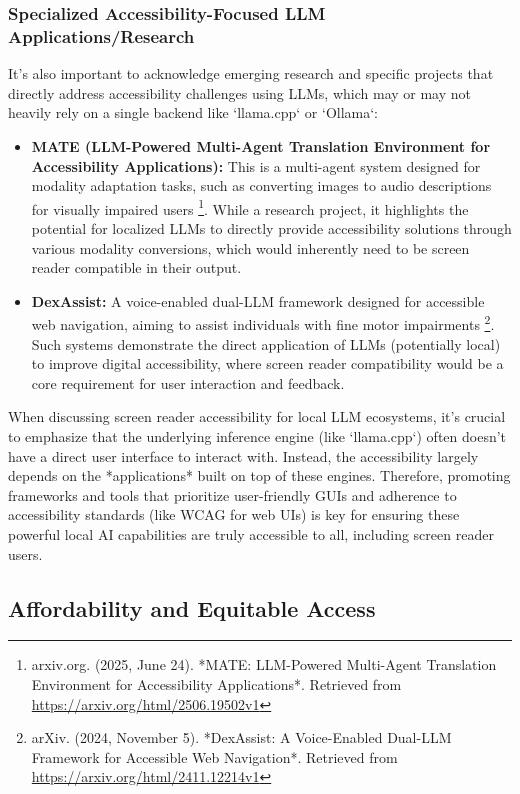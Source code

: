 \subsubsection{Specialized Accessibility-Focused LLM Applications/Research}
It's also important to acknowledge emerging research and specific projects that directly address accessibility challenges using LLMs, which may or may not heavily rely on a single backend like `llama.cpp` or `Ollama`:
\begin{itemize}

    \item \textbf{MATE (LLM-Powered Multi-Agent Translation Environment for Accessibility Applications):} This is a multi-agent system designed for modality adaptation tasks, such as converting images to audio descriptions for visually impaired users \footnote{arxiv.org. (2025, June 24). *MATE: LLM-Powered Multi-Agent Translation Environment for Accessibility Applications*. Retrieved from \url{https://arxiv.org/html/2506.19502v1}}. While a research project, it highlights the potential for localized LLMs to directly provide accessibility solutions through various modality conversions, which would inherently need to be screen reader compatible in their output.

    \item \textbf{DexAssist:} A voice-enabled dual-LLM framework designed for accessible web navigation, aiming to assist individuals with fine motor impairments \footnote{arXiv. (2024, November 5). *DexAssist: A Voice-Enabled Dual-LLM Framework for Accessible Web Navigation*. Retrieved from \url{https://arxiv.org/html/2411.12214v1}}. Such systems demonstrate the direct application of LLMs (potentially local) to improve digital accessibility, where screen reader compatibility would be a core requirement for user interaction and feedback.

\end{itemize}

When discussing screen reader accessibility for local LLM ecosystems, it's crucial to emphasize that the underlying inference engine (like `llama.cpp`) often doesn't have a direct user interface to interact with. Instead, the accessibility largely depends on the *applications* built on top of these engines. Therefore, promoting frameworks and tools that prioritize user-friendly GUIs and adherence to accessibility standards (like WCAG for web UIs) is key for ensuring these powerful local AI capabilities are truly accessible to all, including screen reader users.
\subsection{Affordability and Equitable Access}

